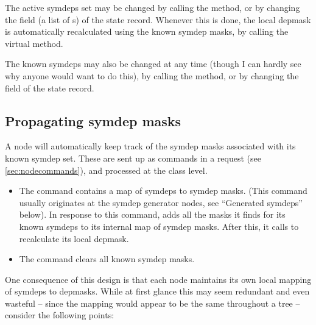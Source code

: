   The active symdeps set may be changed by calling the 
  method, or by changing the  field (a list of s)
  of the state record. Whenever this is done, the local depmask is
  automatically recalculated using the known symdep masks, by calling the
  virtual  method.

  The known symdeps may also be changed at any time (though I can hardly see
  why anyone would want to do this), by calling the 
  method, or by changing the   field of the state record. 
  
\subsection{Propagating symdep masks}

  A node will automatically keep track of the symdep masks associated with its
  known symdep set. These are sent up as commands in a request (see
  \ref{sec:nodecommands}), and processed at the  class level.

  \begin{itemize}
  
  \item The  command contains a map of symdeps to symdep
    masks. (This command usually originates at the symdep generator nodes, see
    ``Generated symdeps'' below). In response to this command,  adds
    all the masks it finds for its known symdeps to its internal map of symdep
    masks. After this, it calls  to recalculate its
    local depmask. 

  \item The  command clears all known symdep masks.
  
  \end{itemize}
  
  One consequence of this design is that each node maintains its own local
  mapping of symdeps to depmasks. While at first glance this may seem redundant
  and even wasteful -- since the mapping would appear to be the same throughout
  a tree -- consider the following points:

